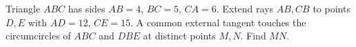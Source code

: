 Triangle $ABC$ has sides $AB=4$, $BC=5$, $CA=6$. Extend rays $AB,CB$ to points $D,E$ with $AD=12$, $CE=15$. A common external tangent touches the circumcircles of $ABC$ and $DBE$ at distinct points $M,N$. Find $MN$.
